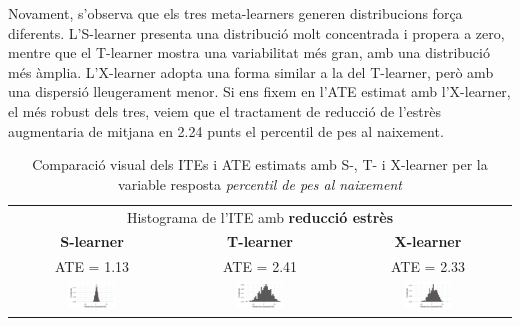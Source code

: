 \documentclass[../main.tex]{subfiles}
\begin{document}
    Novament, s’observa que els tres meta-learners generen distribucions força diferents. L’S-learner presenta una distribució molt concentrada i propera a zero, mentre que el T-learner mostra una variabilitat més gran, amb una distribució més àmplia. L’X-learner adopta una forma similar a la del T-learner, però amb una dispersió lleugerament menor. Si ens fixem en l’ATE estimat amb l’X-learner, el més robust dels tres, veiem que el tractament de reducció de l’estrès augmentaria de mitjana en 2.24 punts el percentil de pes al naixement.

    \begin{table}[H]
        \centering
        \begin{tabular}{ccc}
        \multicolumn{3}{c}{Histograma de l'ITE amb \textbf{reducció estrès}} \\
        \small \textbf{S-learner} & \small \textbf{T-learner} & \small \textbf{X-learner} \\
        \footnotesize ATE = 1.13 & \footnotesize ATE = 2.41 & \footnotesize ATE = 2.33 \\
        \includegraphics[width=0.3\textwidth]{imgs/histogrames/hist(percentil_birth)S_tract3.jpg} &
        \includegraphics[width=0.3\textwidth]{imgs/histogrames/hist(percentil_birth)T_tract3.jpg} &
        \includegraphics[width=0.3\textwidth]{imgs/histogrames/hist(percentil_birth)X_tract3.jpg} \\
        \end{tabular}
        \caption{\footnotesize Comparació visual dels ITEs i ATE estimats amb S-, T- i X-learner per la variable resposta \textit{percentil de pes al naixement}}
        \label{tab:histITE_percentil3}
    \end{table}
\end{document}
